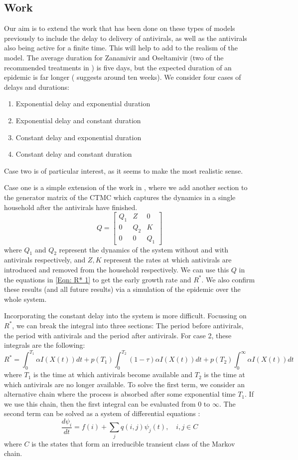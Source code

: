 \subsection{Work}
Our aim is to extend the work that has been done on these types of models previously to include the delay to delivery of antivirals, as well as the antivirals also being active for a finite time. This will help to add to the realism of the model. The average duration for Zanamivir and Oseltamivir (two of the recommended treatments in \cite{Stiver:2003}) is five days, but the expected duration of an epidemic is far longer (\cite{Fleming:1999} suggests around ten weeks). We consider four cases of delays and durations:
\begin{enumerate}
  \item Exponential delay and exponential duration
  \item Exponential delay and constant duration
  \item Constant delay and exponential duration
  \item Constant delay and constant duration
\end{enumerate}
Case two is of particular interest, as it seems to make the most realistic sense.

Case one is a simple extension of the work in \cite{Black:2013}, where we add another section to the generator matrix of the CTMC which captures the dynamics in a single household after the antivirals have finished.
$$Q=\begin{bmatrix} Q_1 & Z & 0 \\
0 & Q_2 & K \\
0 & 0 & Q_1 \end{bmatrix} $$
where $Q_1$ and $Q_2$ represent the dynamics of the system without and with antivirals respectively, and $Z, K$ represent the rates at which antivirals are introduced and removed from the household respectively. We can use this $Q$ in the equations in \ref{Eqn: R* 1} to get the early growth rate and $R^*$. We also confirm these results (and all future results) via a simulation of the epidemic over the whole system.

Incorporating the constant delay into the system is more difficult. Focussing on $R^*$, we can break the integral into three sections: The period before antivirals, the period with antivirals and the period after antivirals. For case 2, these integrals are the following:
\begin{equation}
R^*=\int_0^{T_1} \alpha I(X(t))dt + p(T_1)\int_0^{T_2} (1-\tau)\alpha I(X(t))dt + p(T_2)\int_0^\infty \alpha I(X(t))dt
\end{equation}
where $T_1$ is the time at which antivirals become available and $T_2$ is the time at which antivirals are no longer available. To solve the first term, we consider an alternative chain where the process is absorbed after some exponential time $T_1$. If we use this chain, then the first integral can be evaluated from 0 to $\infty$. The second term can be solved as a system of differential equations \cite{Black:2013}:
$$\frac{d\psi_i}{dt}=f(i)+\sum_j q(i,j)\psi_j(t), \quad i,j \in C$$
where $C$ is the states that form an irreducible transient class of the Markov chain.